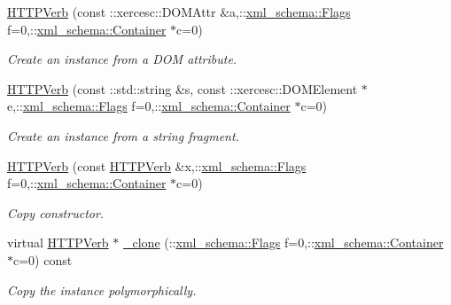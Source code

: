 \begin{DoxyCompactItemize}
\hyperlink{classopenstack_1_1xml_1_1HTTPVerb_a107d2b055be893bca08bad2645f205e8}{HTTPVerb} (const ::xercesc::DOMAttr \&a,::\hyperlink{namespacexml__schema_affb4c227cbd9aa7453dd1dc5a1401943}{xml\_\-schema::Flags} f=0,::\hyperlink{namespacexml__schema_a333dea2213742aea47a37532dec4ec27}{xml\_\-schema::Container} $\ast$c=0)
\begin{DoxyCompactList}\small\item\em Create an instance from a DOM attribute. \item\end{DoxyCompactList}\item 
\hyperlink{classopenstack_1_1xml_1_1HTTPVerb_a80b2b8520e2c497c8737e8ccd4fb8d01}{HTTPVerb} (const ::std::string \&s, const ::xercesc::DOMElement $\ast$e,::\hyperlink{namespacexml__schema_affb4c227cbd9aa7453dd1dc5a1401943}{xml\_\-schema::Flags} f=0,::\hyperlink{namespacexml__schema_a333dea2213742aea47a37532dec4ec27}{xml\_\-schema::Container} $\ast$c=0)
\begin{DoxyCompactList}\small\item\em Create an instance from a string fragment. \item\end{DoxyCompactList}\item 
\hyperlink{classopenstack_1_1xml_1_1HTTPVerb_acad54a7badabe6f6ccbf2da0356d7afe}{HTTPVerb} (const \hyperlink{classopenstack_1_1xml_1_1HTTPVerb}{HTTPVerb} \&x,::\hyperlink{namespacexml__schema_affb4c227cbd9aa7453dd1dc5a1401943}{xml\_\-schema::Flags} f=0,::\hyperlink{namespacexml__schema_a333dea2213742aea47a37532dec4ec27}{xml\_\-schema::Container} $\ast$c=0)
\begin{DoxyCompactList}\small\item\em Copy constructor. \item\end{DoxyCompactList}\item 
virtual \hyperlink{classopenstack_1_1xml_1_1HTTPVerb}{HTTPVerb} $\ast$ \hyperlink{classopenstack_1_1xml_1_1HTTPVerb_ac5222a347ae4cacb30656293a678300d}{\_\-clone} (::\hyperlink{namespacexml__schema_affb4c227cbd9aa7453dd1dc5a1401943}{xml\_\-schema::Flags} f=0,::\hyperlink{namespacexml__schema_a333dea2213742aea47a37532dec4ec27}{xml\_\-schema::Container} $\ast$c=0) const 
\begin{DoxyCompactList}\small\item\em Copy the instance polymorphically. \item\end{DoxyCompactList}\item 

\end{DoxyCompactItemize}
